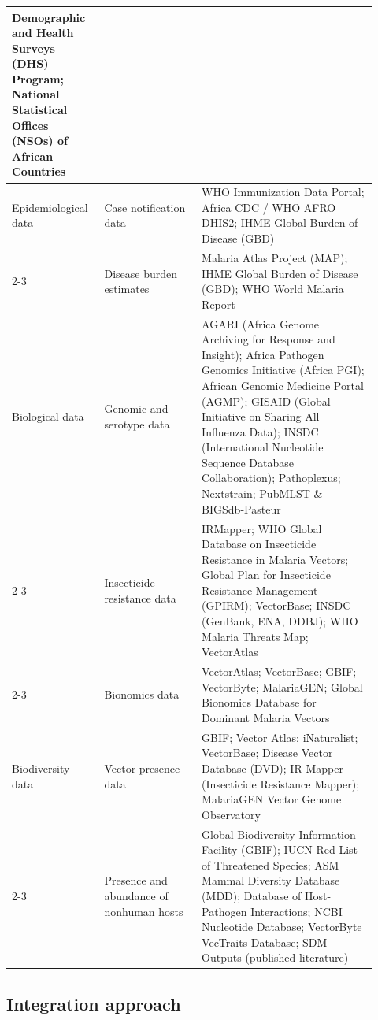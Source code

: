 \documentclass{article}
\begin{document}
\begin{longtable}{|p{0.22\linewidth}|p{0.25\linewidth}|p{0.45\linewidth}|}
    Demographic and Health Surveys (DHS) Program;
    National Statistical Offices (NSOs) of African Countries \\
    \hline 
    Epidemiological data &
    Case notification data &
    WHO Immunization Data Portal;
    Africa CDC / WHO AFRO DHIS2;
    IHME Global Burden of Disease (GBD) \\
    \cline{2-3}
    &
    Disease burden estimates &
    Malaria Atlas Project (MAP);
    IHME Global Burden of Disease (GBD);
    WHO World Malaria Report \\
    \hline
    Biological data &
    Genomic and serotype data &
    AGARI (Africa Genome Archiving for Response and Insight);
    Africa Pathogen Genomics Initiative (Africa PGI);
    African Genomic Medicine Portal (AGMP);
    GISAID (Global Initiative on Sharing All Influenza Data);
    INSDC (International Nucleotide Sequence Database Collaboration);
    Pathoplexus;
    Nextstrain;
    PubMLST \& BIGSdb-Pasteur \\
    \cline{2-3} 
    &
    Insecticide resistance data &
    IRMapper;
    WHO Global Database on Insecticide Resistance in Malaria Vectors;
    Global Plan for Insecticide Resistance Management (GPIRM);
    VectorBase;
    INSDC (GenBank, ENA, DDBJ);
    WHO Malaria Threats Map;
    VectorAtlas \\
    \cline{2-3} 
    &
    Bionomics data &
    VectorAtlas;
    VectorBase;
    GBIF;
    VectorByte;
    MalariaGEN;
    Global Bionomics Database for Dominant Malaria Vectors \\
    \hline 
    Biodiversity data &
    Vector presence data &
    GBIF;
    Vector Atlas;
    iNaturalist;
    VectorBase;
    Disease Vector Database (DVD);
    IR Mapper (Insecticide Resistance Mapper);
    MalariaGEN Vector Genome Observatory \\
    \cline{2-3}
    &
    Presence and abundance of nonhuman hosts &
    Global Biodiversity Information Facility (GBIF);
    IUCN Red List of Threatened Species;
    ASM Mammal Diversity Database (MDD);
    Database of Host-Pathogen Interactions;
    NCBI Nucleotide Database;
    VectorByte VecTraits Database;
    SDM Outputs (published literature) \\
    \hline
\end{longtable}
\endgroup

\subsection{Integration approach}
\end{document}
